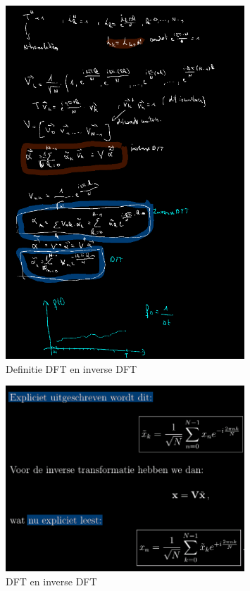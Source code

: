\documentclass[a4paper]{report}
\begin{document}
\begin{figure}[H]
	\centering
	\includegraphics[width=0.8\textwidth]{assets/def_dft_inverse_dft.png}
	\caption{Definitie DFT en inverse DFT}
	\label{fig:def_dft_inverse_dft}
\end{figure}

\begin{figure}[H]
	\centering
	\includegraphics[width=0.8\textwidth]{assets/dft_inverse_dft_textbook.png}
	\caption{DFT en inverse DFT}
	\label{fig:dft_inverse_dft_textbook}
\end{figure}
\end{document}
